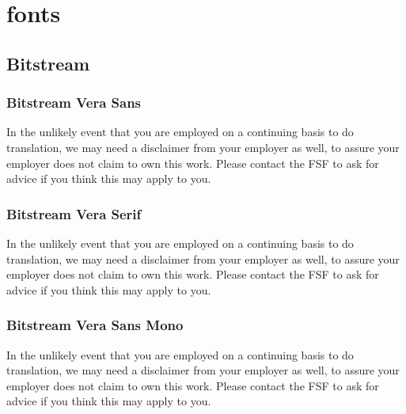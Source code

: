 \documentclass[a4paper,12pt,openany]{report}
\begin{document}
\chapter{fonts}

\section{Bitstream}
  \subsection{Bitstream Vera Sans}
    In the unlikely event that you are employed on a continuing basis to do
    translation, we may need a disclaimer from your employer as well, to assure
    your employer does not claim to own this work.  Please contact the FSF to
    ask for advice if you think this may apply to you.

  \subsection{Bitstream Vera Serif}
    In the unlikely event that you are employed on a continuing basis to do
    translation, we may need a disclaimer from your employer as well, to assure
    your employer does not claim to own this work.  Please contact the FSF to
    ask for advice if you think this may apply to you.

  \subsection{Bitstream Vera Sans Mono}
    In the unlikely event that you are employed on a continuing basis to do
    translation, we may need a disclaimer from your employer as well, to assure
    your employer does not claim to own this work.  Please contact the FSF to
    ask for advice if you think this may apply to you.
\end{document}
